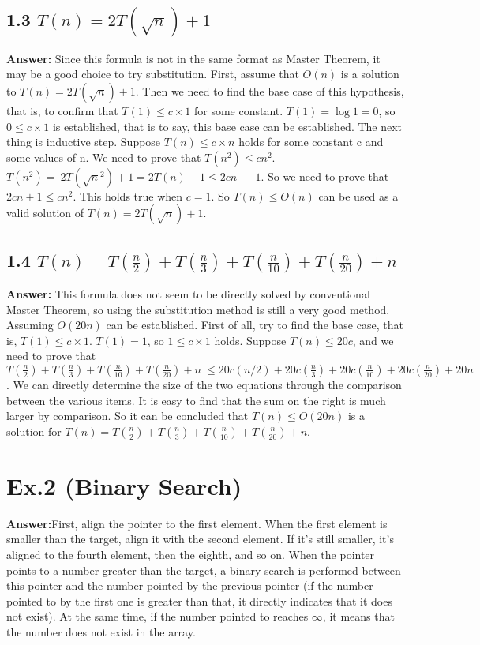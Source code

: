\documentclass{article}
\begin{document}
    \subsection*{1.3 $T\left(n\right)=2T\left(\sqrt{n}\right)+1$}
    \textbf{Answer:} Since this formula is not in the same format as Master Theorem, it may be a good choice to try substitution. First, assume that $O\left(n\right)$ is a solution to $T\left(n\right)=2T\left(\sqrt{n}\right)+1$. Then we need to find the base case of this hypothesis, that is, to confirm that $T\left(1\right)\le c\times 1$ for some constant. $T\left(1\right)=\log 1=0$, so $0\le c\times 1$ is established, that is to say, this base case can be established. The next thing is inductive step. Suppose $T\left(n\right)\le c\times n$ holds for some constant c and some values of n. We need to prove that $T\left(n^2\right)\le cn^2$. $T\left(n^2\right)=\:2T\left(\sqrt{n}^2\right)+1=2T\left(n\right)+1\le 2cn\:+\:1$. So we need to prove that $2cn+1\le cn^2$. This holds true when $c=1$. So $T\left(n\right)\le O\left(n\right)$ can be used as a valid solution of $T\left(n\right)=2T\left(\sqrt{n}\right)+1$.
    \subsection*{1.4 $T\left(n\right)=T\left(\frac{n}{2}\right)+T\left(\frac{n}{3}\right)+T\left(\frac{n}{10}\right)+T\left(\frac{n}{20}\right)+n$}
    \textbf{Answer:} This formula does not seem to be directly solved by conventional Master Theorem, so using the substitution method is still a very good method. Assuming $O\left(20n\right)$ can be established. First of all, try to find the base case, that is, $T\left(1\right)\le c\times 1$. $T\left(1\right)=1$, so $1\le c\times 1$ holds. Suppose $T\left(n\right)\le 20c$, and we need to prove that $T\left(\frac{n}{2}\right)+T\left(\frac{n}{3}\right)+T\left(\frac{n}{10}\right)+T\left(\frac{n}{20}\right)+n\:\le 20c\left(n/2\right)+20c\left(\frac{n}{3}\right)+20c\left(\frac{n}{10}\right)+20c\left(\frac{n}{20}\right)+20n$. We can directly determine the size of the two equations through the comparison between the various items. It is easy to find that the sum on the right is much larger by comparison. So it can be concluded that $T\left(n\right)\le O\left(20n\right)$ is a solution for $T\left(n\right)=T\left(\frac{n}{2}\right)+T\left(\frac{n}{3}\right)+T\left(\frac{n}{10}\right)+T\left(\frac{n}{20}\right)+n$.
\section*{Ex.2 (Binary Search)}
    \textbf{Answer:}First, align the pointer to the first element. When the first element is smaller than the target, align it with the second element. If it's still smaller, it's aligned to the fourth element, then the eighth, and so on. When the pointer points to a number greater than the target, a binary search is performed between this pointer and the number pointed by the previous pointer (if the number pointed to by the first one is greater than that, it directly indicates that it does not exist). At the same time, if the number pointed to reaches $\infty$, it means that the number does not exist in the array.
\end{document}
